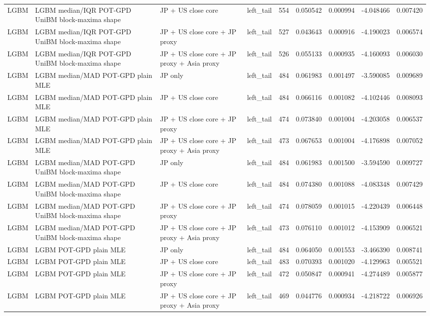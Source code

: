 \begin{tabular}{lll lrrrrr}
LGBM & LGBM median/IQR POT-GPD UniBM block-maxima shape & JP + US close core & left\_tail & 554 & 0.050542 & 0.000994 & -4.048466 & 0.007420 \\
LGBM & LGBM median/IQR POT-GPD UniBM block-maxima shape & JP + US close core + JP proxy & left\_tail & 527 & 0.043643 & 0.000916 & -4.190023 & 0.006574 \\
LGBM & LGBM median/IQR POT-GPD UniBM block-maxima shape & JP + US close core + JP proxy + Asia proxy & left\_tail & 526 & 0.055133 & 0.000935 & -4.160093 & 0.006030 \\
LGBM & LGBM median/MAD POT-GPD plain MLE & JP only & left\_tail & 484 & 0.061983 & 0.001497 & -3.590085 & 0.009689 \\
LGBM & LGBM median/MAD POT-GPD plain MLE & JP + US close core & left\_tail & 484 & 0.066116 & 0.001082 & -4.102446 & 0.008093 \\
LGBM & LGBM median/MAD POT-GPD plain MLE & JP + US close core + JP proxy & left\_tail & 474 & 0.073840 & 0.001004 & -4.203058 & 0.006537 \\
LGBM & LGBM median/MAD POT-GPD plain MLE & JP + US close core + JP proxy + Asia proxy & left\_tail & 473 & 0.067653 & 0.001004 & -4.176898 & 0.007052 \\
LGBM & LGBM median/MAD POT-GPD UniBM block-maxima shape & JP only & left\_tail & 484 & 0.061983 & 0.001500 & -3.594590 & 0.009727 \\
LGBM & LGBM median/MAD POT-GPD UniBM block-maxima shape & JP + US close core & left\_tail & 484 & 0.074380 & 0.001088 & -4.083348 & 0.007429 \\
LGBM & LGBM median/MAD POT-GPD UniBM block-maxima shape & JP + US close core + JP proxy & left\_tail & 474 & 0.078059 & 0.001015 & -4.220439 & 0.006448 \\
LGBM & LGBM median/MAD POT-GPD UniBM block-maxima shape & JP + US close core + JP proxy + Asia proxy & left\_tail & 473 & 0.076110 & 0.001012 & -4.153909 & 0.006521 \\
LGBM & LGBM POT-GPD plain MLE & JP only & left\_tail & 484 & 0.064050 & 0.001553 & -3.466390 & 0.008741 \\
LGBM & LGBM POT-GPD plain MLE & JP + US close core & left\_tail & 483 & 0.070393 & 0.001020 & -4.129963 & 0.005521 \\
LGBM & LGBM POT-GPD plain MLE & JP + US close core + JP proxy & left\_tail & 472 & 0.050847 & 0.000941 & -4.274489 & 0.005877 \\
LGBM & LGBM POT-GPD plain MLE & JP + US close core + JP proxy + Asia proxy & left\_tail & 469 & 0.044776 & 0.000934 & -4.218722 & 0.006926 \\

\end{tabular}
